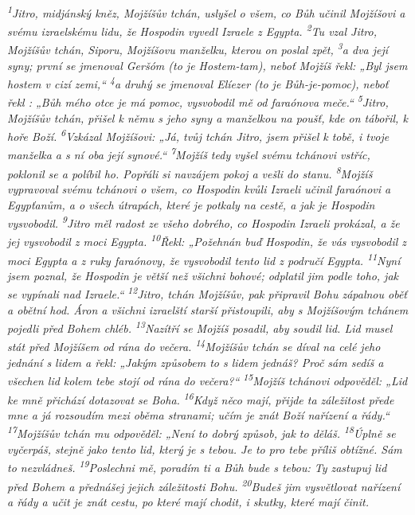 \documentclass[11pt]{article}
\begin{document}
\textit{
\textsuperscript{1}Jitro, midjánský kněz, Mojžíšův tchán, uslyšel o všem, co Bůh učinil Mojžíšovi a svému izraelskému lidu, že Hospodin vyvedl Izraele z Egypta.
\textsuperscript{2}Tu vzal Jitro, Mojžíšův tchán, Siporu, Mojžíšovu manželku, kterou on poslal zpět,
\textsuperscript{3}a dva její syny; první se jmenoval Geršóm (to je Hostem-tam), neboť Mojžíš řekl: „Byl jsem hostem v cizí zemi,“
\textsuperscript{4}a druhý se jmenoval Elíezer (to je Bůh-je-pomoc), neboť řekl : „Bůh mého otce je má pomoc, vysvobodil mě od faraónova meče.“
\textsuperscript{5}Jitro, Mojžíšův tchán, přišel k němu s jeho syny a manželkou na poušť, kde on tábořil, k hoře Boží.
\textsuperscript{6}Vzkázal Mojžíšovi: „Já, tvůj tchán Jitro, jsem přišel k tobě, i tvoje manželka a s ní oba její synové.“
\textsuperscript{7}Mojžíš tedy vyšel svému tchánovi vstříc, poklonil se a políbil ho. Popřáli si navzájem pokoj a vešli do stanu.
\textsuperscript{8}Mojžíš vypravoval svému tchánovi o všem, co Hospodin kvůli Izraeli učinil faraónovi a Egypťanům, a o všech útrapách, které je potkaly na cestě, a jak je Hospodin vysvobodil.
\textsuperscript{9}Jitro měl radost ze všeho dobrého, co Hospodin Izraeli prokázal, a že jej vysvobodil z moci Egypta.
\textsuperscript{10}Řekl: „Požehnán buď Hospodin, že vás vysvobodil z moci Egypta a z ruky faraónovy, že vysvobodil tento lid z područí Egypta.
\textsuperscript{11}Nyní jsem poznal, že Hospodin je větší než všichni bohové; odplatil jim podle toho, jak se vypínali nad Izraele.“
\textsuperscript{12}Jitro, tchán Mojžíšův, pak připravil Bohu zápalnou oběť a obětní hod. Áron a všichni izraelští starší přistoupili, aby s Mojžíšovým tchánem pojedli před Bohem chléb.
\textsuperscript{13}Nazítří se Mojžíš posadil, aby soudil lid. Lid musel stát před Mojžíšem od rána do večera.
\textsuperscript{14}Mojžíšův tchán se díval na celé jeho jednání s lidem a řekl: „Jakým způsobem to s lidem jednáš? Proč sám sedíš a všechen lid kolem tebe stojí od rána do večera?“
\textsuperscript{15}Mojžíš tchánovi odpověděl: „Lid ke mně přichází dotazovat se Boha.
\textsuperscript{16}Když něco mají, přijde ta záležitost přede mne a já rozsoudím mezi oběma stranami; učím je znát Boží nařízení a řády.“
\textsuperscript{17}Mojžíšův tchán mu odpověděl: „Není to dobrý způsob, jak to děláš.
\textsuperscript{18}Úplně se vyčerpáš, stejně jako tento lid, který je s tebou. Je to pro tebe příliš obtížné. Sám to nezvládneš.
\textsuperscript{19}Poslechni mě, poradím ti a Bůh bude s tebou: Ty zastupuj lid před Bohem a přednášej jejich záležitosti Bohu.
\textsuperscript{20}Budeš jim vysvětlovat nařízení a řády a učit je znát cestu, po které mají chodit, i skutky, které mají činit.
}
\end{document}
